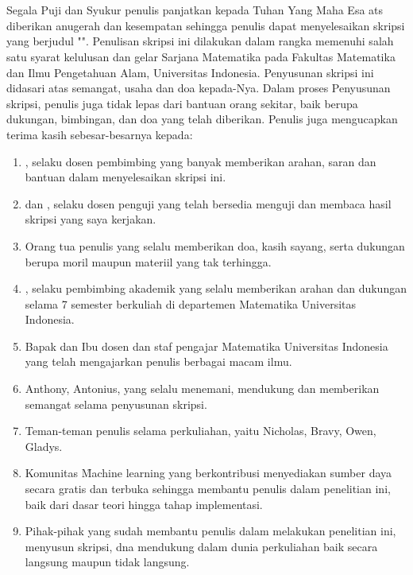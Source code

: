 \chapter*{\kataPengantar}
\pagestyle{first-pages}

Segala Puji dan Syukur penulis panjatkan kepada Tuhan Yang Maha Esa ats diberikan anugerah dan kesempatan sehingga penulis dapat menyelesaikan skripsi yang berjudul "\judul". Penulisan skripsi ini dilakukan dalam rangka memenuhi salah satu syarat kelulusan dan gelar Sarjana Matematika pada Fakultas Matematika dan Ilmu Pengetahuan Alam, Universitas Indonesia. Penyusunan skripsi ini didasari atas semangat, usaha dan doa kepada-Nya. Dalam proses Penyusunan skripsi, penulis juga tidak lepas dari bantuan orang sekitar, baik berupa dukungan, bimbingan, dan doa yang telah diberikan. Penulis juga mengucapkan terima kasih sebesar-besarnya kepada:

\begin{enumerate}
	\item \pembimbingSatu, selaku dosen pembimbing yang banyak memberikan arahan, saran dan bantuan dalam menyelesaikan skripsi ini.
	\item \pengujiSatu dan \pengujiDua, selaku dosen penguji yang telah bersedia menguji dan membaca hasil skripsi yang saya kerjakan.
	\item Orang tua penulis yang selalu memberikan doa, kasih sayang, serta dukungan berupa moril maupun materiil yang tak terhingga. 
	\item \pengujiDua, selaku pembimbing akademik yang selalu memberikan arahan dan dukungan selama 7 semester berkuliah di departemen Matematika Universitas Indonesia.
	\item Bapak dan Ibu dosen dan staf pengajar Matematika Universitas Indonesia yang telah mengajarkan penulis berbagai macam ilmu.
	\item Anthony, Antonius, yang selalu menemani, mendukung dan memberikan semangat selama penyusunan skripsi.
	\item Teman-teman penulis selama perkuliahan, yaitu Nicholas, Bravy, Owen, Gladys.
	\item Komunitas \f{Machine learning} yang berkontribusi menyediakan sumber daya secara gratis dan terbuka sehingga membantu penulis dalam penelitian ini, baik dari dasar teori hingga tahap implementasi.
	\item Pihak-pihak yang sudah membantu penulis dalam melakukan penelitian ini, menyusun skripsi, dna mendukung dalam dunia perkuliahan baik secara langsung maupun tidak langsung.
\end{enumerate}

